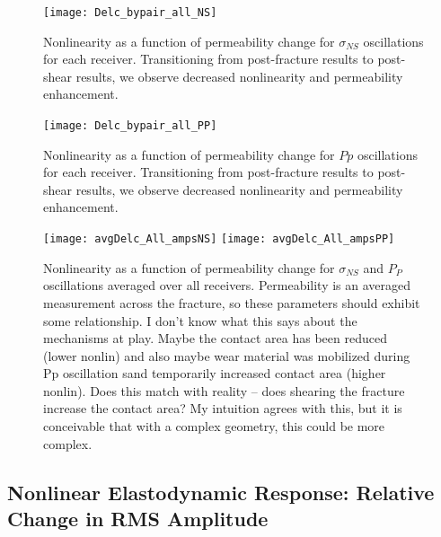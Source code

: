 \newpage


\begin{figure}[ht]
	\centering
	\texttt{[image: Delc\_bypair\_all\_NS]}
	\caption{Nonlinearity as a function of permeability change for $ \sigma_{NS} $ oscillations for each receiver. Transitioning from post-fracture results to post-shear results, we observe decreased nonlinearity and permeability enhancement.}
\end{figure}


\begin{figure}[t]
	\centering
	\texttt{[image: Delc\_bypair\_all\_PP]}
	\caption{Nonlinearity as a function of permeability change for $ Pp $ oscillations for each receiver. Transitioning from post-fracture results to post-shear results, we observe decreased nonlinearity and permeability enhancement.}
\end{figure}

\newpage


\begin{figure}[ht]
	\centering
	\texttt{[image: avgDelc\_All\_ampsNS]}
	\texttt{[image: avgDelc\_All\_ampsPP]}
	\caption{Nonlinearity as a function of permeability change for $ \sigma_{NS} $ and $ P_P $ oscillations averaged over all receivers. Permeability is an averaged measurement across the fracture, so these parameters should exhibit some relationship. I don’t know what this says about the mechanisms at play. Maybe the contact area has been reduced (lower nonlin) and also maybe wear material was mobilized during Pp oscillation sand temporarily increased contact area (higher nonlin). Does this match with reality -- does shearing the fracture increase the contact area? My intuition agrees with this, but it is conceivable that with a complex geometry, this could be more complex.}
	\label{fig:delc_plots2}
\end{figure}

\newpage


\subsection{Nonlinear Elastodynamic Response: Relative Change in RMS Amplitude}

